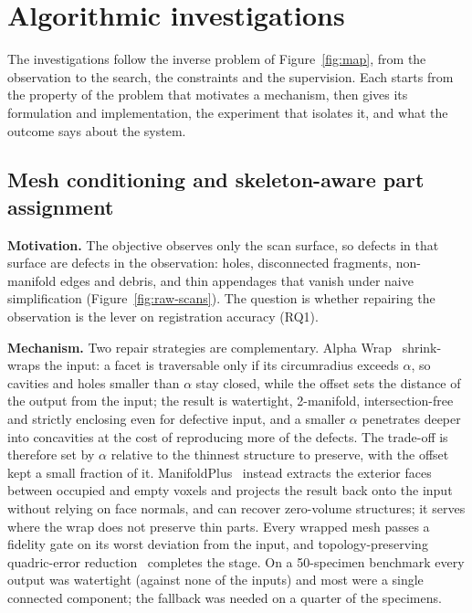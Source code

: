 \section{Algorithmic investigations}
\label{sec:algo}

The investigations follow the inverse problem of Figure~\ref{fig:map}, from the
observation to the search, the constraints and the supervision. Each starts from
the property of the problem that motivates a mechanism, then gives its
formulation and implementation, the experiment that isolates it, and what the
outcome says about the system.

\subsection{Mesh conditioning and skeleton-aware part assignment}
\label{sec:prep}

\textbf{Motivation.} The objective observes only the scan surface, so defects in
that surface are defects in the observation: holes, disconnected fragments,
non-manifold edges and debris, and thin appendages that vanish under naive
simplification (Figure~\ref{fig:raw-scans}). The question is whether repairing the
observation is the lever on registration accuracy (RQ1).

\textbf{Mechanism.} Two repair strategies are complementary. Alpha Wrap~\cite{alphawrap} shrink-wraps the input: a
facet is traversable only if its circumradius exceeds $\alpha$, so cavities and
holes smaller than $\alpha$ stay closed, while the offset sets the distance of the
output from the input; the result is watertight, 2-manifold, intersection-free and
strictly enclosing even for defective input, and a smaller $\alpha$ penetrates
deeper into concavities at the cost of reproducing more of the defects. The
trade-off is therefore set by $\alpha$ relative to the thinnest structure to
preserve, with the offset kept a small fraction of it.
ManifoldPlus~\cite{manifoldplus} instead extracts the exterior faces between
occupied and empty voxels and projects the result back onto the input without
relying on face normals, and can recover zero-volume structures; it serves where
the wrap does not preserve thin parts. Every wrapped mesh passes a fidelity gate on
its worst deviation from the input, and topology-preserving quadric-error
reduction~\cite{qem} completes the stage. On a 50-specimen benchmark every output
was watertight (against none of the inputs) and most were a single connected
component; the fallback was needed on a quarter of the specimens.



